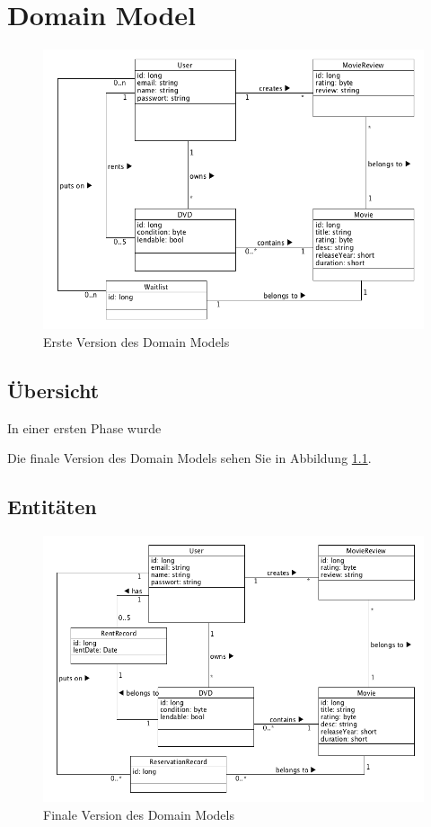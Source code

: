 \chapter{Domain Model}
\label{chap:domainmodel}

\begin{figure}[h]
	\centering
	\includegraphics[width=1\textwidth]{img/domain_model.png}
	\caption{Erste Version des Domain Models}
\end{figure}

\section{Übersicht}
In einer ersten Phase wurde 

Die finale Version des Domain Models sehen Sie in Abbildung \ref{fig:domainmodel}.

\section{Entitäten}







\begin{figure}[h]
	\centering
	\includegraphics[width=1\textwidth]{img/domain_model2.png}
	\caption{Finale Version des Domain Models}
	\label{fig:domainmodel}
\end{figure}

